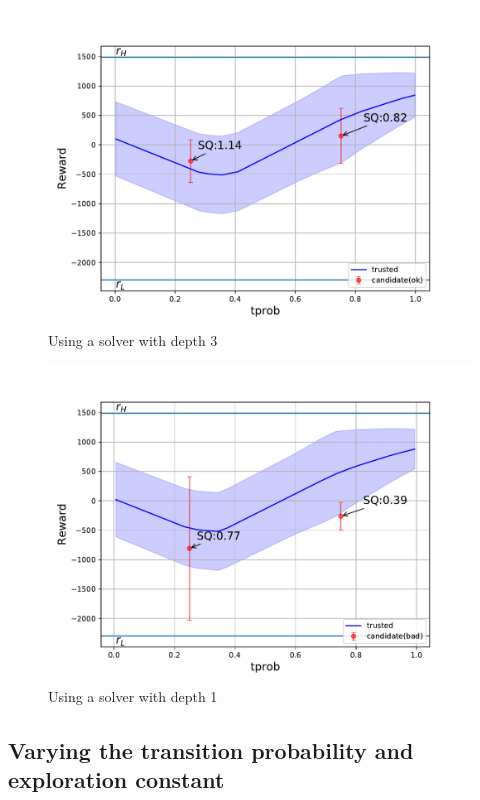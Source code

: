\begin{figure}[htbp]
    \centering
    \includegraphics[width=0.9\linewidth]{Figures/transition_vary_tprob_ok.pdf}
    \caption{Using a solver with depth 3}
    \label{fig:tprob}
\end{figure}
\begin{figure}[htbp]
    \centering
    \includegraphics[width=0.9\linewidth]{Figures/transition_vary_tprob_bad.pdf}
    \caption{Using a solver with depth 1}
    \label{fig:tprob}
\end{figure}

\subsection{Varying the transition probability and exploration constant}

